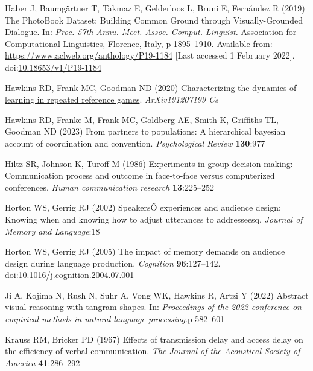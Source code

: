 \documentclass[
  english,
  a4paper,
]{article}
\newlength{\cslhangindent}
\newlength{\cslentryspacingunit} %
\newenvironment{CSLReferences}[2] %
 {%
  \setlength{\parindent}{0pt}
  \ifodd #1
  \let\oldpar\par
  \def\par{\hangindent=\cslhangindent\oldpar}
  \fi
  \setlength{\parskip}{#2\cslentryspacingunit}
 }%
 {}
\begin{document}
\begin{CSLReferences}{1}{0}
\leavevmode{}%
Haber J, Baumgärtner T, Takmaz E, Gelderloos L, Bruni E, Fernández R (2019) The {PhotoBook Dataset}: {Building Common Ground} through {Visually-Grounded Dialogue}. In: \emph{Proc. 57th {Annu}. {Meet}. {Assoc}. {Comput}. {Linguist}.} {Association for Computational Linguistics}, {Florence, Italy}, p 1895--1910. Available from: \url{https://www.aclweb.org/anthology/P19-1184} {[}Last accessed 1 February 2022{]}. doi:\href{https://doi.org/10.18653/v1/P19-1184}{10.18653/v1/P19-1184}

\leavevmode{}%
Hawkins RD, Frank MC, Goodman ND (2020) \href{http://arxiv.org/abs/1912.07199}{Characterizing the dynamics of learning in repeated reference games}. \emph{ArXiv191207199 Cs}

\leavevmode{}%
Hawkins RD, Franke M, Frank MC, Goldberg AE, Smith K, Griffiths TL, Goodman ND (2023) From partners to populations: A hierarchical bayesian account of coordination and convention. \emph{Psychological Review} \textbf{130}:977

\leavevmode{}%
Hiltz SR, Johnson K, Turoff M (1986) Experiments in group decision making: Communication process and outcome in face-to-face versus computerized conferences. \emph{Human communication research} \textbf{13}:225--252

\leavevmode{}%
Horton WS, Gerrig RJ (2002) {SpeakersÕ} experiences and audience design: Knowing when and knowing how to adjust utterances to addresseesq. \emph{Journal of Memory and Language}:18

\leavevmode{}%
Horton WS, Gerrig RJ (2005) The impact of memory demands on audience design during language production. \emph{Cognition} \textbf{96}:127--142. doi:\href{https://doi.org/10.1016/j.cognition.2004.07.001}{10.1016/j.cognition.2004.07.001}

\leavevmode{}%
Ji A, Kojima N, Rush N, Suhr A, Vong WK, Hawkins R, Artzi Y (2022) Abstract visual reasoning with tangram shapes. In: \emph{Proceedings of the 2022 conference on empirical methods in natural language processing}.p 582--601

\leavevmode{}%
Krauss RM, Bricker PD (1967) Effects of transmission delay and access delay on the efficiency of verbal communication. \emph{The Journal of the Acoustical Society of America} \textbf{41}:286--292


\end{CSLReferences}
\end{document}
